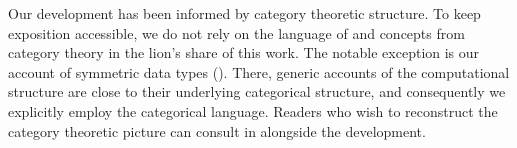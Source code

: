 \begin{remark}
  Our development has been informed by category theoretic
  structure. To keep exposition accessible, we do not rely on the
  language of and concepts from category theory in the lion's share of this
  work.  The notable exception is our account of symmetric data types
  (). There, generic accounts of the
  computational structure are close to their underlying categorical
  structure, and consequently we explicitly employ the categorical
  language. Readers who wish to reconstruct the category theoretic
  picture can consult  in
   alongside the development.
\end{remark}
